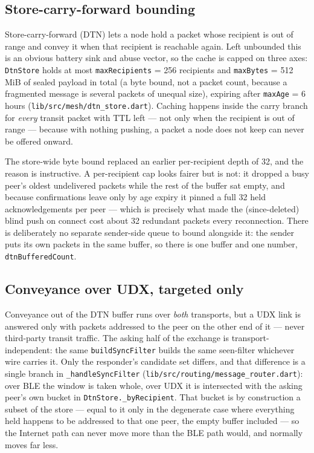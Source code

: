 \documentclass[11pt]{report}
\newcommand{\code}[1]{\texttt{\small #1}}
\begin{document}
\subsection{Store-carry-forward bounding}

Store-carry-forward (DTN) lets a node hold a packet whose recipient is out of range and convey it when that recipient is reachable again. Left unbounded this is an obvious battery sink and abuse vector, so the cache is capped on three axes: \code{DtnStore} holds at most \code{maxRecipients} = 256 recipients and \code{maxBytes} = 512\,MiB of sealed payload in total (a byte bound, not a packet count, because a fragmented message is several packets of unequal size), expiring after \code{maxAge} = 6 hours (\code{lib/src/mesh/dtn_store.dart}). Caching happens inside the carry branch for \emph{every} transit packet with TTL left --- not only when the recipient is out of range --- because with nothing pushing, a packet a node does not keep can never be offered onward.

The store-wide byte bound replaced an earlier per-recipient depth of 32, and the reason is instructive. A per-recipient cap looks fairer but is not: it dropped a busy peer's oldest undelivered packets while the rest of the buffer sat empty, and because confirmations leave only by age expiry it pinned a full 32 held acknowledgements per peer --- which is precisely what made the (since-deleted) blind push on connect cost about 32 redundant packets every reconnection. There is deliberately no separate sender-side queue to bound alongside it: the sender puts its own packets in the same buffer, so there is one buffer and one number, \code{dtnBufferedCount}.

\subsection{Conveyance over UDX, targeted only}

Conveyance out of the DTN buffer runs over \emph{both} transports, but a UDX link is answered only with packets addressed to the peer on the other end of it --- never third-party transit traffic. The asking half of the exchange is transport-independent: the same \code{buildSyncFilter} builds the same seen-filter whichever wire carries it. Only the responder's candidate set differs, and that difference is a single branch in \code{\_handleSyncFilter} (\code{lib/src/routing/message\_router.dart}): over BLE the window is taken whole, over UDX it is intersected with the asking peer's own bucket in \code{DtnStore.\_byRecipient}. That bucket is by construction a subset of the store --- equal to it only in the degenerate case where everything held happens to be addressed to that one peer, the empty buffer included --- so the Internet path can never move more than the BLE path would, and normally moves far less.
\end{document}
